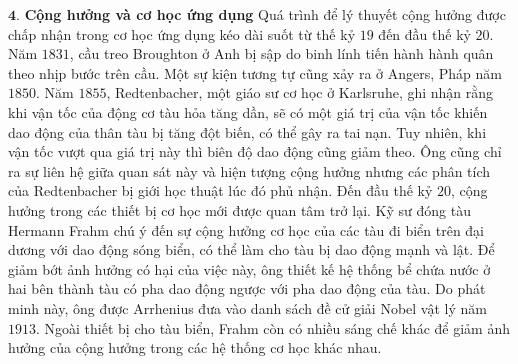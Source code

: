 \begin{multicols}{2}
\begin{figure}[H]
		\vspace*{-5pt}
	\end{figure}
	\vskip 0.2cm
	$\pmb{4.}$ \textbf{\color{timhieukhoahoc}Cộng hưởng và cơ học ứng dụng}
	\vskip 0.1cm
	Quá trình để lý thuyết cộng hưởng được chấp nhận trong cơ học ứng dụng kéo dài suốt từ thế kỷ $19$ đến đầu thế kỷ $20$. Năm $1831$, cầu treo Broughton ở Anh bị sập do binh lính tiến hành hành quân theo nhịp bước trên cầu. Một sự kiện tương tự cũng xảy ra ở Angers, Pháp năm $1850$. Năm $1855$, Redtenbacher, một giáo sư cơ học ở Karlsruhe, ghi nhận rằng khi vận tốc của động cơ tàu hỏa tăng dần, sẽ có một giá trị của vận tốc khiến dao động của thân tàu bị tăng đột biến, có thể gây ra tai nạn. Tuy nhiên, khi vận tốc vượt qua giá trị này thì biên độ dao động cũng giảm theo. Ông cũng chỉ ra sự liên hệ giữa quan sát này và hiện tượng cộng hưởng nhưng các phân tích của Redtenbacher bị giới học thuật lúc đó phủ nhận.
	\vskip 0.1cm
	Đến đầu thế kỷ $20$, cộng hưởng trong các thiết bị cơ học mới được quan tâm trở lại. Kỹ sư đóng tàu Hermann Frahm chú ý đến sự cộng hưởng cơ học của các tàu đi biển trên đại dương với dao động sóng biển, có thể làm cho tàu bị dao động mạnh và lật. Để giảm bớt ảnh hưởng có hại của việc này, ông thiết kế hệ thống bể chứa nước ở hai bên thành tàu có pha dao động ngược với pha dao động của tàu. Do phát minh này, ông được Arrhenius đưa vào danh sách đề cử giải Nobel vật lý năm $1913$. Ngoài thiết bị cho tàu biển, Frahm còn có nhiều sáng chế khác để giảm ảnh hưởng của cộng hưởng trong các hệ thống cơ học khác nhau.

\end{multicols}
